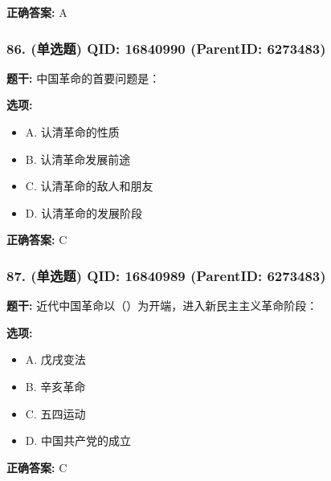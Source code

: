 \documentclass[12pt,UTF8]{ctexart}
\begin{document}
\textbf{正确答案:}
A

\vspace{0.3em}\hrulefill\vspace{0.7em}

\subsubsection*{86. (单选题) \small QID: 16840990 (ParentID: 6273483)}

\textbf{题干:}
中国革命的首要问题是：



\textbf{选项:}
\begin{itemize}[leftmargin=*]

  \item A. 认清革命的性质

  \item B. 认清革命发展前途

  \item C. 认清革命的敌人和朋友

  \item D. 认清革命的发展阶段

\end{itemize}

\textbf{正确答案:}
C

\vspace{0.3em}\hrulefill\vspace{0.7em}

\subsubsection*{87. (单选题) \small QID: 16840989 (ParentID: 6273483)}

\textbf{题干:}
近代中国革命以（）为开端，进入新民主主义革命阶段：



\textbf{选项:}
\begin{itemize}[leftmargin=*]

  \item A. 戊戌变法

  \item B. 辛亥革命

  \item C. 五四运动

  \item D. 中国共产党的成立

\end{itemize}

\textbf{正确答案:}
C
\end{document}

